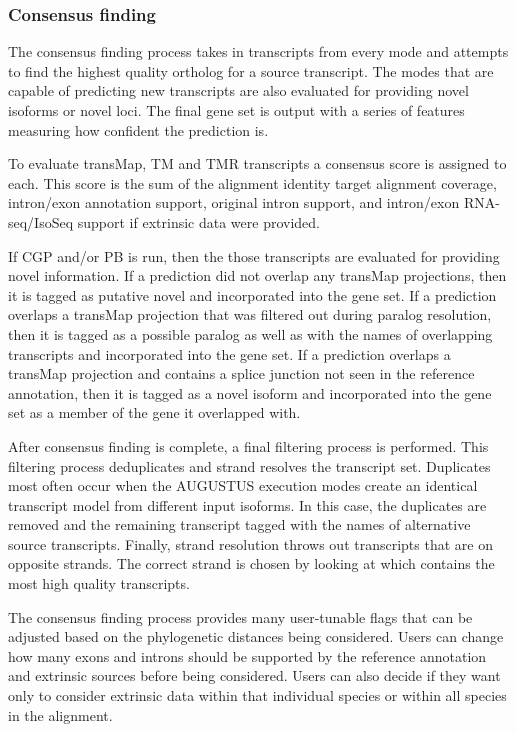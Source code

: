 \documentclass[fleqn,10pt]{wlscirep}
\begin{document}
\subsubsection*{Consensus finding}
	The consensus finding process takes in transcripts from every mode and attempts to find the highest quality ortholog for a source transcript. The modes that are capable of predicting new transcripts are also evaluated for providing novel isoforms or novel loci. The final gene set is output with a series of features measuring how confident the prediction is.
    
	To evaluate transMap, TM and TMR transcripts a consensus score is assigned to each. This score is the sum of the alignment identity target alignment coverage, intron/exon annotation support, original intron support, and intron/exon RNA-seq/IsoSeq support if extrinsic data were provided.
    
	If CGP and/or PB is run, then the those transcripts are evaluated for providing novel information. If a prediction did not overlap any transMap projections, then it is tagged as putative novel and incorporated into the gene set. If a prediction overlaps a transMap projection that was filtered out during paralog resolution, then it is tagged as a possible paralog as well as with the names of overlapping transcripts and incorporated into the gene set. If a prediction overlaps a transMap projection and contains a splice junction not seen in the reference annotation, then it is tagged as a novel isoform and incorporated into the gene set as a member of the gene it overlapped with.
    
	After consensus finding is complete, a final filtering process is performed. This filtering process deduplicates and strand resolves the transcript set. Duplicates most often occur when the AUGUSTUS execution modes create an identical transcript model from different input isoforms. In this case, the duplicates are removed and the remaining transcript tagged with the names of alternative source transcripts. Finally, strand resolution throws out transcripts that are on opposite strands. The correct strand is chosen by looking at which contains the most high quality transcripts.
    
	The consensus finding process provides many user-tunable flags that can be adjusted based on the phylogenetic distances being considered. Users can change how many exons and introns should be supported by the reference annotation and extrinsic sources before being considered. Users can also decide if they want only to consider extrinsic data within that individual species or within all species in the alignment. 
\end{document}
